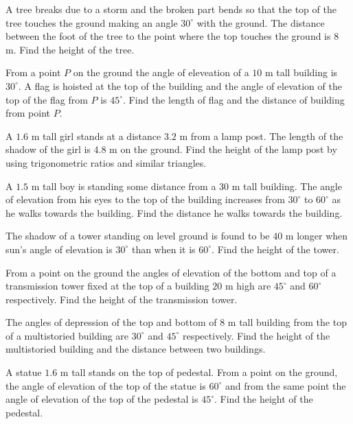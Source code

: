 \item A tree breaks due to a storm and the broken part bends so that the top of the tree touches the ground making an angle
  $30^\circ$ with the ground. The distance between the foot of the tree to the point where the top touches the ground is
  $8$ m. Find the height of the tree.

\item From a point $P$ on the ground the angle of eleveation of a $10$ m tall building is $30^\circ$. A flag is
  hoisted at the top of the building and the angle of elevation of the top of the flag from $P$ is $45^\circ$. Find
  the length of flag and the distance of building from point $P$.

\item A $1.6$ m tall girl stands at a distance $3.2$ m from a lamp post. The length of the shadow of the girl is
  $4.8$ m on the ground. Find the height of the lamp post by using trigonometric ratios and similar triangles.

\item A $1.5$ m tall boy is standing some distance from a $30$ m tall building. The angle of elevation from his eyes to
  the top of the building increases from $30^\circ$ to $60^\circ$ as he walks towards the building. Find the distance
  he walks towards the building.

\item The shadow of a tower standing on level ground is found to be $40$ m longer when sun's angle of elevation is
  $30^\circ$ than when it is $60^\circ$. Find the height of the tower.

\item From a point on the ground the angles of elevation of the bottom and top of a transmission tower fixed at the top of a building
  $20$ m high are $45^\circ$ and $60^\circ$ respectively. Find the height of the transmission tower.

\item The angles of depression of the top and bottom of $8$ m tall building from the top of a multistoried building are
  $30^\circ$ and $45^\circ$ respectively. Find the height of the multistoried building and the distance between two
  buildings.

\item A statue $1.6$ m tall stands on the top of pedestal. From a point on the ground, the angle of elevation of the top of the
  statue is $60^\circ$ and from the same point the angle of elevation of the top of the pedestal is $45^\circ$. Find
  the height of the pedestal.

